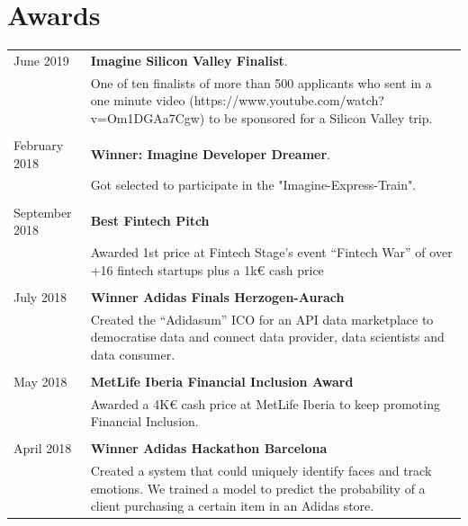 \documentclass[11pt]{article}
\begin{document}
\section*{Awards}
\begin{tabularx}{\textwidth}{sX}
  June 2019      & \textbf{Imagine Silicon Valley Finalist}. \\
                 &  One of ten finalists of more than 500 applicants who sent in a one minute
                   video (https://www.youtube.com/watch?v=Om1DGAa7Cgw) to be sponsored for a Silicon Valley trip. \\\\
  February 2018  & \textbf{Winner: Imagine Developer Dreamer}. \\
                 &  Got selected to participate in the "Imagine-Express-Train". \\\\
  September 2018 & \textbf{Best Fintech Pitch} \\
                 & Awarded 1st price at Fintech Stage's event ``Fintech War'' of over
                   +16 fintech startups plus a 1k€ cash price \\\\
  July 2018      & \textbf{Winner Adidas Finals Herzogen-Aurach} \\
                 &  Created the ``Adidasum'' ICO for an API data marketplace to
                   democratise data and connect data provider, data scientists and
                   data consumer.\\\\
  May 2018       & \textbf{MetLife Iberia Financial Inclusion Award} \\
                 & Awarded a 4K€ cash price at MetLife Iberia to keep
                   promoting Financial Inclusion. \\\\
  April 2018     & \textbf{Winner Adidas Hackathon Barcelona} \\
                 & Created a system that could uniquely identify faces and track
                   emotions. We trained a model to predict the probability of a
                   client purchasing a certain item in an Adidas store.
\end{tabularx}
		


\end{document}
